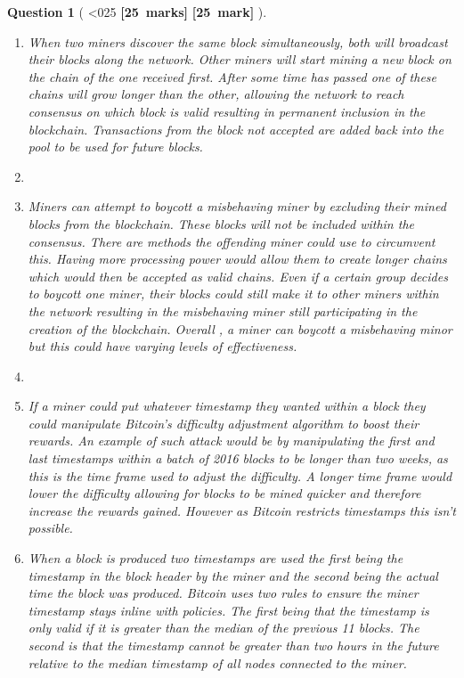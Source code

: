 \documentclass[a4paper]{article}
\theoremstyle{que}
\newtheorem{question}{Question}
\newcommand{\fixoffset}{\mbox{}\vspace*{-\bigskipamount}\vspace*{-\medskipamount}}
\newcommand\points[1]{%
\ifnum1<0#1\relax%
    {\bf \small [#1~marks]}%
  \else%
    {\bf \small [#1~mark]}%
  \fi%
}%
\begin{document}
\begin{question}[\points{25}]
  \fixoffset
  \begin{enumerate}[label=(\alph*)]
    \item When two miners discover the same block simultaneously, both will broadcast their blocks along the network. Other miners will start mining a new block on the chain of the one received first. After some time has passed one of these chains will grow longer than the other, allowing the network to reach consensus on which block is valid resulting in permanent inclusion in the blockchain. Transactions from the block not accepted are added back into the pool to be used for future blocks. \cite{nakamoto2008bitcoin}
    
    \item 
    
    \item Miners can attempt to boycott a misbehaving miner by excluding their mined blocks from the blockchain. These blocks will not be included within the consensus. There are methods the offending miner could use to circumvent this. Having more processing power would allow them to create longer chains which would then be accepted as valid chains. Even if a certain group decides to boycott one miner, their blocks could still make it to other miners within the network resulting in the misbehaving miner still participating in the creation of the blockchain. Overall , a miner can boycott a misbehaving minor but this could have varying levels of effectiveness.
    
    \item 
    \item[(i)] If a miner could put whatever timestamp they wanted within a block they could manipulate Bitcoin's difficulty adjustment algorithm to boost their rewards. An example of such attack would be by manipulating the first and last timestamps within a batch of 2016 blocks to be longer than two weeks, as this is the time frame used to adjust the difficulty. A longer time frame would lower the difficulty allowing for blocks to be mined quicker and therefore increase the rewards gained. However as Bitcoin restricts timestamps this isn't possible.
    
    \item[(ii)] When a block is produced two timestamps are used the first being the timestamp in the block header by the miner and the second being the actual time the block was produced. Bitcoin uses two rules to ensure the miner timestamp stays inline with policies. The first being that the timestamp is only valid if it is greater than the median of the previous 11 blocks. The second is that the timestamp cannot be greater than two hours in the future relative to the median timestamp of all nodes connected to the miner. \cite{bitcoinwiki_block_timestamp} \cite{bitmex_block_timestamp}
    

\end{enumerate}
\end{question}
\end{document}
